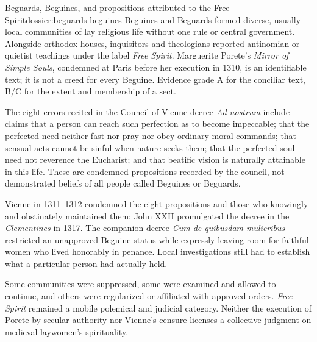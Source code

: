 \begin{heresydossier}{Beguards, Beguines, and propositions attributed to the Free Spirit}{dossier:beguards-beguines}
\objectfield Beguines and Beguards formed diverse, usually local communities of lay religious life without one rule or central government. Alongside orthodox houses, inquisitors and theologians reported antinomian or quietist teachings under the label \emph{Free Spirit}. Marguerite Porete's \emph{Mirror of Simple Souls}, condemned at Paris before her execution in 1310, is an identifiable text; it is not a creed for every Beguine. Evidence grade A for the conciliar text, B/C for the extent and membership of a sect.

\propositionfield The eight errors recited in the Council of Vienne decree \emph{Ad nostrum} include claims that a person can reach such perfection as to become impeccable; that the perfected need neither fast nor pray nor obey ordinary moral commands; that sensual acts cannot be sinful when nature seeks them; that the perfected soul need not reverence the Eucharist; and that beatific vision is naturally attainable in this life. These are condemned propositions recorded by the council, not demonstrated beliefs of all people called Beguines or Beguards.

\responsefield Vienne in 1311--1312 condemned the eight propositions and those who knowingly and obstinately maintained them; John XXII promulgated the decree in the \emph{Clementines} in 1317. The companion decree \emph{Cum de quibusdam mulieribus} restricted an unapproved Beguine status while expressly leaving room for faithful women who lived honorably in penance. Local investigations still had to establish what a particular person had actually held.

\aftermathfield Some communities were suppressed, some were examined and allowed to continue, and others were regularized or affiliated with approved orders. \emph{Free Spirit} remained a mobile polemical and judicial category. Neither the execution of Porete by secular authority nor Vienne's censure licenses a collective judgment on medieval laywomen's spirituality.
\end{heresydossier}

